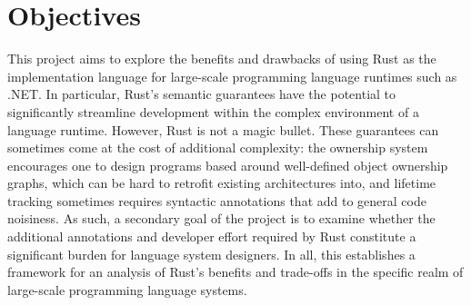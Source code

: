 \section{Objectives}
This project aims to explore the benefits and drawbacks of using Rust as the implementation language for large-scale
programming language runtimes such as .NET.
In particular, Rust's semantic guarantees have the potential to significantly streamline development within the
complex environment of a language runtime.
However, Rust is not a magic bullet.
These guarantees can sometimes come at the cost of additional complexity: the ownership system encourages one to design programs
based around well-defined object ownership graphs, which can be hard to retrofit existing architectures into, and lifetime tracking
sometimes requires syntactic annotations that add to general code noisiness.
As such, a secondary goal of the project is to examine whether the additional annotations and developer effort
required by Rust constitute a significant burden for language system designers.
In all, this establishes a framework for an analysis of Rust's benefits and trade-offs in the specific realm of large-scale programming language systems.
